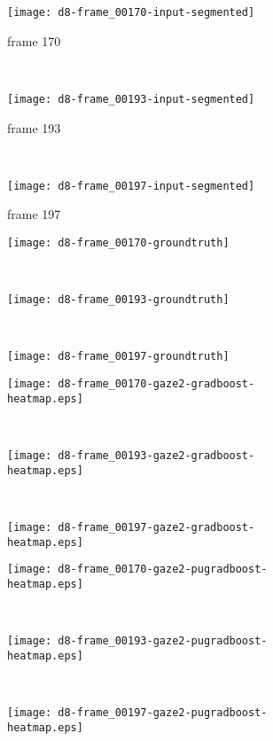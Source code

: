 \begin{figure}[ht]
	\centering
	\begin{subfigure}[h]{0.32\textwidth}
	\texttt{[image: d8-frame\_00170-input-segmented]}	
		\caption*{frame 170}
	\end{subfigure}
	~
	\begin{subfigure}[h]{0.32\textwidth}
	\texttt{[image: d8-frame\_00193-input-segmented]}	
		\caption*{frame 193}
	\end{subfigure}
	~
	\begin{subfigure}[h]{0.32\textwidth}
	\texttt{[image: d8-frame\_00197-input-segmented]}	
		\caption*{frame 197}
	\end{subfigure}

	\vspace{3mm}
	\begin{subfigure}[h]{0.32\textwidth}
	\texttt{[image: d8-frame\_00170-groundtruth]}	
	\end{subfigure}
	~
	\begin{subfigure}[h]{0.32\textwidth}
	\texttt{[image: d8-frame\_00193-groundtruth]}	
	\end{subfigure}
	~
	\begin{subfigure}[h]{0.32\textwidth}
	\texttt{[image: d8-frame\_00197-groundtruth]}	
	\end{subfigure}		
	
	\vspace{3mm}
	\begin{subfigure}[h]{0.32\textwidth}
	\texttt{[image: d8-frame\_00170-gaze2-gradboost-heatmap.eps]}	
	\end{subfigure}
	~
	\begin{subfigure}[h]{0.32\textwidth}
	\texttt{[image: d8-frame\_00193-gaze2-gradboost-heatmap.eps]}
	\end{subfigure}
	~	
	\begin{subfigure}[h]{0.32\textwidth}
	\texttt{[image: d8-frame\_00197-gaze2-gradboost-heatmap.eps]}	
	\end{subfigure}
	
	\vspace{3mm}
	\begin{subfigure}[h]{0.32\textwidth}
	\texttt{[image: d8-frame\_00170-gaze2-pugradboost-heatmap.eps]}	
	\end{subfigure}
	~
	\begin{subfigure}[h]{0.32\textwidth}
	\texttt{[image: d8-frame\_00193-gaze2-pugradboost-heatmap.eps]}	
	\end{subfigure}
	~	
	\begin{subfigure}[h]{0.32\textwidth}
	\texttt{[image: d8-frame\_00197-gaze2-pugradboost-heatmap.eps]}	
	\end{subfigure}	
	

\end{figure}
